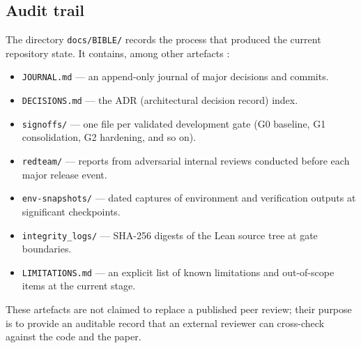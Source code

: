\subsection{Audit trail}

The directory \texttt{docs/BIBLE/} records the process that produced the
current repository state. It contains, among other artefacts :

\begin{itemize}
  \item \texttt{JOURNAL.md} --- an append-only journal of major decisions
        and commits.
  \item \texttt{DECISIONS.md} --- the ADR (architectural decision record)
        index.
  \item \texttt{signoffs/} --- one file per validated development gate
        (G0 baseline, G1 consolidation, G2 hardening, and so on).
  \item \texttt{redteam/} --- reports from adversarial internal reviews
        conducted before each major release event.
  \item \texttt{env-snapshots/} --- dated captures of environment and
        verification outputs at significant checkpoints.
  \item \texttt{integrity\_logs/} --- SHA-256 digests of the Lean source
        tree at gate boundaries.
  \item \texttt{LIMITATIONS.md} --- an explicit list of known limitations
        and out-of-scope items at the current stage.
\end{itemize}

These artefacts are not claimed to replace a published peer review; their
purpose is to provide an auditable record that an external reviewer can
cross-check against the code and the paper.

